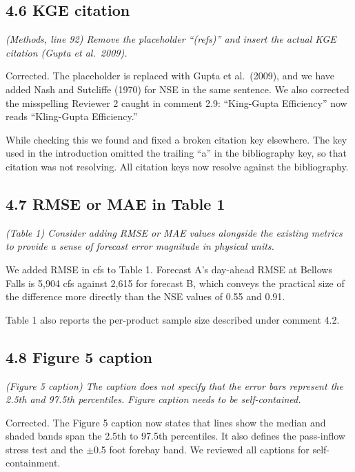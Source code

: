 \documentclass[11pt]{article}
\newenvironment{rc}%
  {\begin{list}{}{\setlength{\leftmargin}{1.5em}\setlength{\rightmargin}{1.5em}%
   \setlength{\topsep}{0.2em}\setlength{\parsep}{0pt}\setlength{\itemsep}{0pt}}%
   \item[]\itshape\color{quotegray}}%
  {\end{list}}
\begin{document}
\subsection*{4.6 KGE citation}

\begin{rc}
(Methods, line 92) Remove the placeholder ``(refs)'' and insert the actual KGE citation (Gupta et
al.\ 2009).
\end{rc}

Corrected. The placeholder is replaced with Gupta et al.\ (2009), and we have added Nash and
Sutcliffe (1970) for NSE in the same sentence. We also corrected the misspelling Reviewer 2 caught in
comment 2.9: ``King-Gupta Efficiency'' now reads ``Kling-Gupta Efficiency.''

While checking this we found and fixed a broken citation key elsewhere. The key used in the
introduction omitted the trailing ``a'' in the bibliography key, so that citation was not resolving.
All citation keys now resolve against the bibliography.

\subsection*{4.7 RMSE or MAE in Table 1}

\begin{rc}
(Table 1) Consider adding RMSE or MAE values alongside the existing metrics to provide a sense of
forecast error magnitude in physical units.
\end{rc}

We added RMSE in cfs to Table 1. Forecast A's day-ahead
RMSE at Bellows Falls is 5,904 cfs against 2,615 for forecast B, which conveys the practical size of
the difference more directly than the NSE values of 0.55 and 0.91.

Table 1 also reports the per-product sample size described under comment 4.2.

\subsection*{4.8 Figure 5 caption}

\begin{rc}
(Figure 5 caption) The caption does not specify that the error bars represent the 2.5th and 97.5th
percentiles. Figure caption needs to be self-contained.
\end{rc}

Corrected. The Figure 5 caption now states that lines show the median and shaded bands span the
2.5th to 97.5th percentiles. It also defines the pass-inflow stress test and the $\pm$0.5 foot
forebay band. We reviewed all captions for self-containment.
\end{document}

